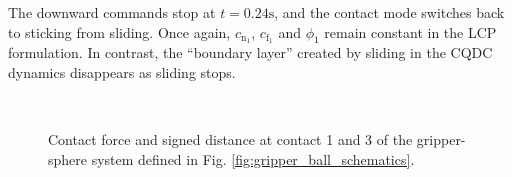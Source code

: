 The downward commands stop at $t = 0.24 \mathrm{s}$, and the contact mode switches back to sticking from sliding. Once again, $c_{\mathrm{n}_1}$, $c_{\mathrm{f}_1}$ and $\phi_1$ remain constant in the LCP formulation. In contrast, the ``boundary layer'' created by sliding in the CQDC dynamics disappears as sliding stops.

\begin{figure}
\centering
{}\\
\caption{Contact force and signed distance at contact 1 and 3 of the gripper-sphere system defined in Fig. \ref{fig:gripper_ball_schematics}.}
\label{fig:contact_force_distance}
\end{figure}

